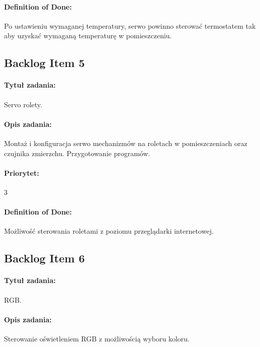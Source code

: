 	\paragraph{Definition of Done:} 
	Po ustawieniu wymaganej temperatury, serwo powinno sterować termostatem tak aby uzyskać wymaganą temperaturę w pomieszczeniu.
	

	
	\subsection{Backlog Item 5}
	\paragraph{Tytuł zadania:}
	Servo rolety.
	
	\paragraph{Opis zadania:} 
	Montaż i konfiguracja serwo mechanizmów na roletach w pomieszczeniach oraz czujnika zmierzchu.	Przygotowanie programów.
	
	\paragraph{Priorytet:}
	3
	
	\paragraph{Definition of Done:}
	Możliwość sterowania roletami z poziomu przeglądarki internetowej.


	
	\subsection{Backlog Item 6}
	\paragraph{Tytuł zadania:}
	RGB.
	
	\paragraph{Opis zadania:}
	Sterowanie oświetleniem RGB z możliwością wyboru koloru.
	 
